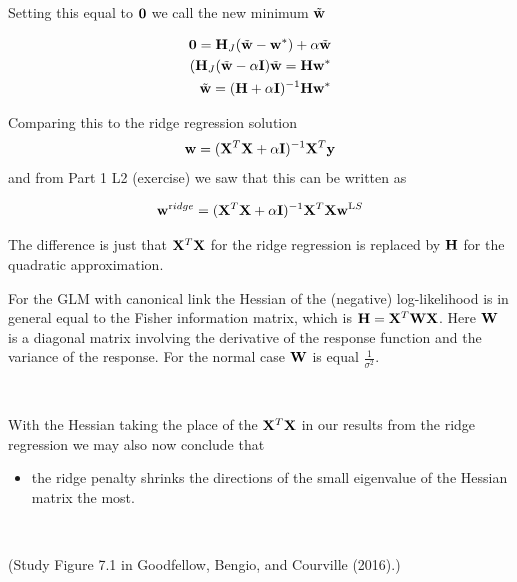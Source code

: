 \documentclass[
  ignorenonframetext,
]{beamer}
\providecommand{\tightlist}{%
  \setlength{\itemsep}{0pt}\setlength{\parskip}{0pt}}
\begin{document}
\begin{frame}
Setting this equal to \({\bf 0}\) we call the new minimum
\(\tilde{\bf w}\)

\begin{eqnarray*}
{\bf 0}={\bf H}_J(\tilde{\bf w}-{\bf w}^*)+\alpha \tilde{\bf w}\\
({\bf H}_J(\tilde{\bf w}-\alpha {\bf I})\tilde{\bf w}={\bf H}{\bf w}^*\\
\tilde{\bf w}=({\bf H}+\alpha {\bf I})^{-1}{\bf H}{\bf w}^*
\end{eqnarray*}

Comparing this to the ridge regression solution
\[ {\bf w}=({\bf X}^T{\bf X}+\alpha {\bf I})^{-1}{\bf X}^T{\bf y}\] and
from Part 1 L2 (exercise) we saw that this can be written as

\[ {\bf w}^{\text ridge}=({\bf X}^T{\bf X}+\alpha {\bf I})^{-1}{\bf X}^T{\bf X}{\bf w}^{\text LS}\]

The difference is just that \({\bf X}^T {\bf X}\) for the ridge
regression is replaced by \({\bf H}\) for the quadratic approximation.
\end{frame}

\begin{frame}
For the GLM with canonical link the Hessian of the (negative)
log-likelihood is in general equal to the Fisher information matrix,
which is \({\bf H}={\bf X}^{T}{\bf W}{\bf X}\). Here \({\bf W}\) is a
diagonal matrix involving the derivative of the response function and
the variance of the response. For the normal case \({\bf W}\) is equal
\(\frac{1}{\sigma^2}\).

\(~\)

With the Hessian taking the place of the \({\bf X}^T{\bf X}\) in our
results from the ridge regression we may also now conclude that

\begin{itemize}
\tightlist
\item
  the ridge penalty shrinks the directions of the small eigenvalue of
  the Hessian matrix the most.
\end{itemize}

\(~\)

(Study Figure 7.1 in Goodfellow, Bengio, and Courville (2016).)
\end{frame}
\end{document}
